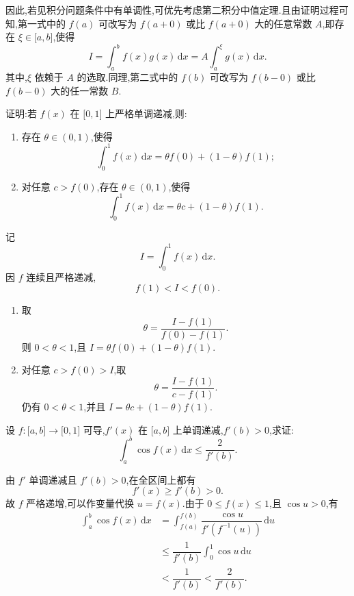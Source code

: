 \begin{remark}
    因此,若见积分问题条件中有单调性,可优先考虑第二积分中值定理.且由证明过程可知,第一式中的 $f(a)$ 可改写为 $f(a+0)$ 或比 $f(a+0)$ 大的任意常数 $A$,即存在 $\xi\in\lbrack a,b\rbrack$,使得
    \[
        I=\int_a^bf(x)g(x)\,\mathrm{d}x
        =A\int_a^\xi g(x)\,\mathrm{d}x.
    \]
    其中,$\xi$ 依赖于 $A$ 的选取.同理,第二式中的 $f(b)$ 可改写为 $f(b-0)$ 或比 $f(b-0)$ 大的任一常数 $B$.
\end{remark}

\begin{example}
    证明:若 $f(x)$ 在 $\lbrack 0,1\rbrack$ 上严格单调递减,则:
    \begin{enumerate}
        \item 存在 $\theta\in(0,1)$,使得
              \[
                  \displaystyle\int_0^1f(x)\,\mathrm{d}x=\theta f(0)+(1-\theta)f(1);
              \]
        \item 对任意 $c>f(0)$,存在 $\theta\in(0,1)$,使得
              \[
                  \displaystyle\int_0^1f(x)\,\mathrm{d}x=\theta c+(1-\theta)f(1).
              \]
    \end{enumerate}
\end{example}
\exampleblank

\begin{solution}
    记
    \[
        I=\int_0^1f(x)\,\mathrm{d}x.
    \]
    因 $f$ 连续且严格递减,
    \[
        f(1)<I<f(0).
    \]
    \begin{enumerate}
        \item 取
              \[
                  \theta=\dfrac{I-f(1)}{f(0)-f(1)}.
              \]
              则 $0<\theta<1$,且 $I=\theta f(0)+(1-\theta)f(1)$.

        \item 对任意 $c>f(0)>I$,取
              \[
                  \theta=\dfrac{I-f(1)}{c-f(1)}.
              \]
              仍有 $0<\theta<1$,并且 $I=\theta c+(1-\theta)f(1)$.
    \end{enumerate}
\end{solution}

\begin{example}
    设 $f:\lbrack a,b\rbrack\to\lbrack 0,1\rbrack$ 可导,$f'(x)$ 在 $\lbrack a,b\rbrack$ 上单调递减,$f'(b)>0$,求证:
    \[
        \displaystyle\int_a^b\cos f(x)\,\mathrm{d}x\leq\dfrac{2}{f'(b)}.
    \]
\end{example}
\exampleblank

\begin{solution}
    由 $f'$ 单调递减且 $f'(b)>0$,在全区间上都有
    \[
        f'(x)\geq f'(b)>0.
    \]
    故 $f$ 严格递增,可以作变量代换 $u=f(x)$.由于 $0\leq f(x)\leq1$,且 $\cos u>0$,有
    \[
        \begin{aligned}
            \int_a^b\cos f(x)\,\mathrm{d}x
             & =\int_{f(a)}^{f(b)}
            \dfrac{\cos u}{f'(f^{-1}(u))}\,\mathrm{d}u         \\
             & \leq\dfrac{1}{f'(b)}\int_0^1\cos u\,\mathrm{d}u \\
             & <\dfrac{1}{f'(b)}
            <\dfrac{2}{f'(b)}.
        \end{aligned}
    \]
\end{solution}

